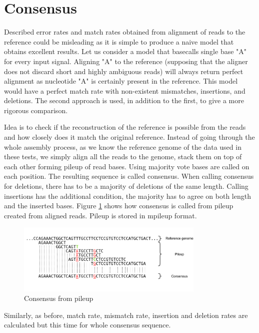 \documentclass[times, utf8, diplomski, numeric, english]{fer}
\begin{document}
\section{Consensus}
Described error rates and match rates obtained from alignment of reads to the reference could be misleading as it is simple to produce a naive model that obtains excellent results. Let us consider a model that basecalls single base "A" for every input signal. Aligning "A" to the reference (supposing that the aligner does not discard short and highly ambiguous reads) will always return perfect alignment as nucleotide "A" is certainly present in the reference. This model would have a perfect match rate with non-existent mismatches, insertions, and deletions.  The second approach is used, in addition to the first, to give a more rigorous comparison.

Idea is to check if the reconstruction of the reference is possible from the reads and how closely does it match the original reference. Instead of going through the whole assembly process, as we know the reference genome of the data used in these tests, we simply align all the reads to the genome, stack them on top of each other forming pileup of read bases. Using majority vote bases are called on each position. The resulting sequence is called consensus. When calling consensus for deletions,  there has to be a majority of deletions of the same length. Calling insertions has the additional condition,  the majority has to agree on both length and the inserted bases. Figure \ref{fg:consensus} shows how consensus is called from pileup created from aligned reads. Pileup is stored in mpileup format.  


\begin{figure}[!ht]
	\begin{center}
		\includegraphics[width=0.8\textwidth]{./imgs/consnesus.png}
		\caption{Consensus from pileup}
		\label{fg:consensus}
	\end{center}
\end{figure}


Similarly, as before, match rate, mismatch rate, insertion and deletion rates are calculated but this time for whole consensus sequence.  
\end{document}
